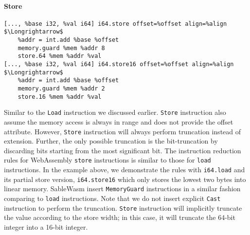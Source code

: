 \paragraph{Store} \quad
\begin{lstlisting}[basicstyle=\linespread{1}\small\ttfamily, language=SableWasmMIR, mathescape=true]
[..., %base i32, %val i64] i64.store offset=%offset align=%align $\Longrightarrow$
    %addr = int.add %base %offset
    memory.guard %mem %addr 8
    store.64 %mem %addr %val
[..., %base i32, %val i64] i64.store16 offset=%offset align=%align $\Longrightarrow$
    %addr = int.add %base %offset
    memory.guard %mem %addr 2
    store.16 %mem %addr %val
\end{lstlisting}
Similar to the \texttt{Load} instruction we discussed earlier. \texttt{Store} instruction also assume the memory access is always in range and does not provide the offset attribute. However, \texttt{Store} instruction will always perform truncation instead of extension. Further, the only possible truncation is the bit-truncation by discarding bits starting from the most significant bit. The instruction reduction rules for WebAssembly \texttt{store} instructions is similar to those for \texttt{load} instructions. In the example above, we demonstrate the rules with \texttt{i64.load} and its partial store version, \texttt{i64.store16} which only stores the lowest two bytes into linear memory. SableWasm insert \texttt{MemoryGuard} instructions in a similar fashion comparing to \texttt{load} instructions. Note that we do not insert explicit \texttt{Cast} instruction to perform the truncation. \texttt{Store} instruction will implicitly truncate the value according to the store width; in this case, it will truncate the 64-bit integer into a 16-bit integer.

